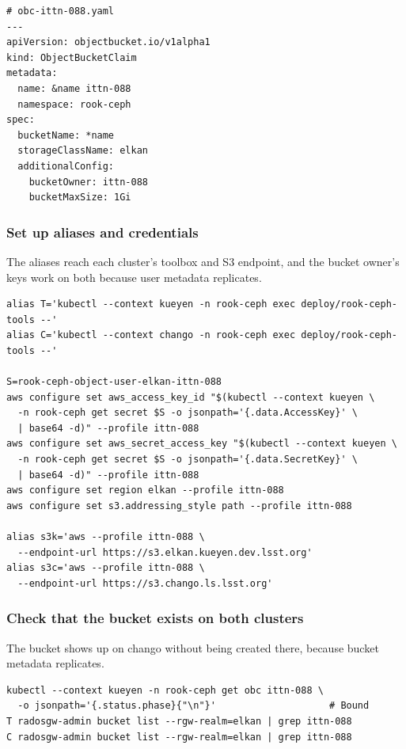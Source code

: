 {\small
\begin{verbatim}
# obc-ittn-088.yaml
---
apiVersion: objectbucket.io/v1alpha1
kind: ObjectBucketClaim
metadata:
  name: &name ittn-088
  namespace: rook-ceph
spec:
  bucketName: *name
  storageClassName: elkan
  additionalConfig:
    bucketOwner: ittn-088
    bucketMaxSize: 1Gi
\end{verbatim}
}

\subsubsection{Set up aliases and credentials}

The aliases reach each cluster's toolbox and S3 endpoint, and the bucket owner's keys work on both because user metadata replicates.

{\small
\begin{verbatim}
alias T='kubectl --context kueyen -n rook-ceph exec deploy/rook-ceph-tools --'
alias C='kubectl --context chango -n rook-ceph exec deploy/rook-ceph-tools --'

S=rook-ceph-object-user-elkan-ittn-088
aws configure set aws_access_key_id "$(kubectl --context kueyen \
  -n rook-ceph get secret $S -o jsonpath='{.data.AccessKey}' \
  | base64 -d)" --profile ittn-088
aws configure set aws_secret_access_key "$(kubectl --context kueyen \
  -n rook-ceph get secret $S -o jsonpath='{.data.SecretKey}' \
  | base64 -d)" --profile ittn-088
aws configure set region elkan --profile ittn-088
aws configure set s3.addressing_style path --profile ittn-088

alias s3k='aws --profile ittn-088 \
  --endpoint-url https://s3.elkan.kueyen.dev.lsst.org'
alias s3c='aws --profile ittn-088 \
  --endpoint-url https://s3.chango.ls.lsst.org'
\end{verbatim}
}

\subsubsection{Check that the bucket exists on both clusters}

The bucket shows up on chango without being created there, because bucket metadata replicates.

{\small
\begin{verbatim}
kubectl --context kueyen -n rook-ceph get obc ittn-088 \
  -o jsonpath='{.status.phase}{"\n"}'                    # Bound
T radosgw-admin bucket list --rgw-realm=elkan | grep ittn-088
C radosgw-admin bucket list --rgw-realm=elkan | grep ittn-088
\end{verbatim}
}

